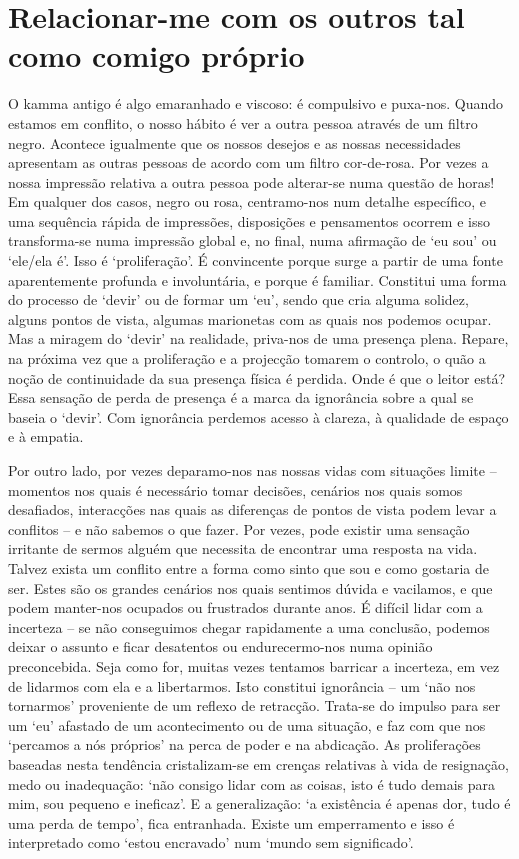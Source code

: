 \section{Relacionar-me com os outros tal como comigo próprio}

O kamma antigo é algo emaranhado e viscoso: é compulsivo e puxa-nos. Quando estamos em conflito, o nosso hábito é ver a outra pessoa através de um filtro negro. Acontece igualmente que os nossos desejos e as nossas necessidades apresentam as outras pessoas de acordo com um filtro cor-de-rosa. Por vezes a nossa impressão relativa a outra pessoa pode alterar-se numa questão de horas! Em qualquer dos casos, negro ou rosa, centramo-nos num detalhe específico, e uma sequência rápida de impressões, disposições e pensamentos ocorrem e isso transforma-se numa impressão global e, no final, numa afirmação de `eu sou' ou `ele/ela é'. Isso é `proliferação'. É convincente porque surge a partir de uma fonte aparentemente profunda e involuntária, e porque é familiar. Constitui uma forma do processo de `devir' ou de formar um `eu', sendo que cria alguma solidez, alguns pontos de vista, algumas marionetas com as quais nos podemos ocupar. Mas a miragem do `devir' na realidade, priva-nos de uma presença plena. Repare, na próxima vez que a proliferação e a projecção tomarem o controlo, o quão a noção de continuidade da sua presença física é perdida. Onde é que o leitor está? Essa sensação de perda de presença é a marca da ignorância sobre a qual se baseia o `devir'. Com ignorância perdemos acesso à clareza, à qualidade de espaço e à empatia.

Por outro lado, por vezes deparamo-nos nas nossas vidas com situações limite -- momentos nos quais é necessário tomar decisões, cenários nos quais somos desafiados, interacções nas quais as diferenças de pontos de vista podem levar a conflitos -- e não sabemos o que fazer. Por vezes, pode existir uma sensação irritante de sermos alguém que necessita de encontrar uma resposta na vida. Talvez exista um conflito entre a forma como sinto que sou e como gostaria de ser. Estes são os grandes cenários nos quais sentimos dúvida e vacilamos, e que podem manter-nos ocupados ou frustrados durante anos. É difícil lidar com a incerteza -- se não conseguimos chegar rapidamente a uma conclusão, podemos deixar o assunto e ficar desatentos ou endurecermo-nos numa opinião preconcebida. Seja como for, muitas vezes tentamos barricar a incerteza, em vez de lidarmos com ela e a libertarmos. Isto constitui ignorância -- um `não nos tornarmos' proveniente de um reflexo de retracção. Trata-se do impulso para ser um `eu' afastado de um acontecimento ou de uma situação, e faz com que nos `percamos a nós próprios' na perca de poder e na abdicação. As proliferações baseadas nesta tendência cristalizam-se em crenças relativas à vida de resignação, medo ou inadequação: `não consigo lidar com as coisas, isto é tudo demais para mim, sou pequeno e ineficaz'. E a generalização: `a existência é apenas dor, tudo é uma perda de tempo', fica entranhada. Existe um emperramento e isso é interpretado como `estou encravado' num `mundo sem significado'.


